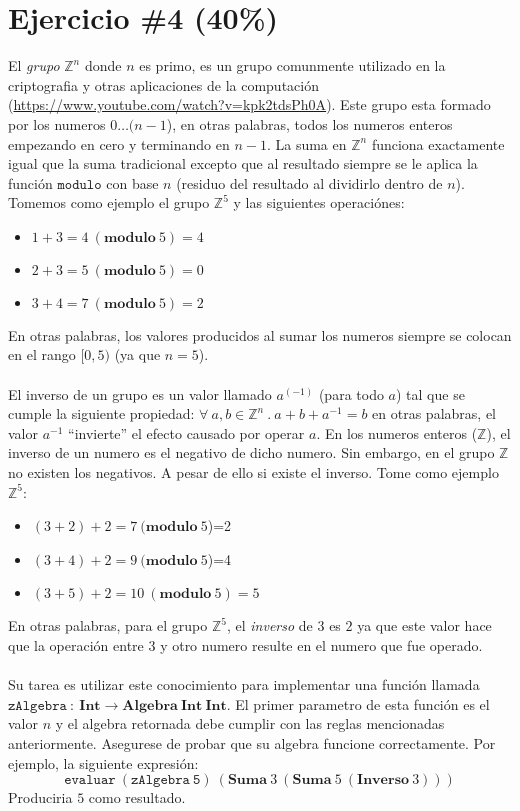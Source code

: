 \documentclass{article}
\begin{document}
\section*{Ejercicio \#4 (40\%)}

El \emph{grupo} $\mathbb{Z}^n$ donde $n$ es primo, es un grupo comunmente utilizado en la criptografia y otras aplicaciones de la computaci\'on
(\url{https://www.youtube.com/watch?v=kpk2tdsPh0A}). Este grupo esta formado por los numeros $0\ldots(n-1$), en otras palabras,
todos los numeros enteros empezando en cero y terminando en $n-1$. La suma en $\mathbb{Z}^n$ funciona exactamente igual que
la suma tradicional excepto que al resultado siempre se le aplica la funci\'on $\mathtt{modulo}$ con base $n$ (residuo del
resultado al dividirlo dentro de $n$). Tomemos como ejemplo el grupo $\mathbb{Z}^5$ y las siguientes operaci\'ones:
\begin{itemize}
        \item{$1+3=4\ (\mathbf{modulo}\ 5)=4$}
        \item{$2+3=5\ (\mathbf{modulo}\ 5)=0$}
        \item{$3+4=7\ (\mathbf{modulo}\ 5)=2$}
\end{itemize}

En otras palabras, los valores producidos al sumar los numeros siempre se colocan en el rango $[0,5)$ (ya que $n=5$).
\\\\
El inverso de un grupo es un valor llamado $a^(-1)$ (para todo $a$) tal que se cumple la siguiente propiedad:
$\forall\ a,b\in\mathbb{Z}^n\ .\ a+b+a^{-1}=b$ en otras palabras, el valor $a^{-1}$ ``invierte'' el efecto causado
por operar $a$. En los numeros enteros ($\mathbb{Z}$), el inverso de un numero es el negativo de dicho numero. Sin
embargo, en el grupo $\mathbb{Z}$ no existen los negativos. A pesar de ello si existe el inverso. Tome como ejemplo $\mathbb{Z}^5$:
\begin{itemize}
        \item{$(3+2)+2=7\ (\mathbf{modulo}\ 5$)=2}
        \item{$(3+4)+2=9\ (\mathbf{modulo}\ 5$)=4}
        \item{$(3+5)+2=10\ (\mathbf{modulo}\ 5)=5$}
\end{itemize}

En otras palabras, para el grupo $\mathbb{Z}^5$, el \emph{inverso} de $3$ es $2$ ya que este valor hace que la operaci\'on
entre $3$ y otro numero resulte en el numero que fue operado.
\\\\
Su tarea es utilizar este conocimiento para implementar una funci\'on llamada $\mathtt{zAlgebra}\ :\ 
\mathbf{Int}\rightarrow\mathbf{Algebra\ Int\ Int}$. El primer parametro de esta funci\'on es el valor $n$
y el algebra retornada debe cumplir con las reglas mencionadas anteriormente. Asegurese de probar que su algebra
funcione correctamente. Por ejemplo, la siguiente expresi\'on:
\[
        \mathtt{evaluar\ (zAlgebra\ 5)}\ (\mathbf{Suma}\ 3\ (\mathbf{Suma}\ 5\ (\mathbf{Inverso}\ 3)))        
\]
Produciria $5$ como resultado.
\end{document}
